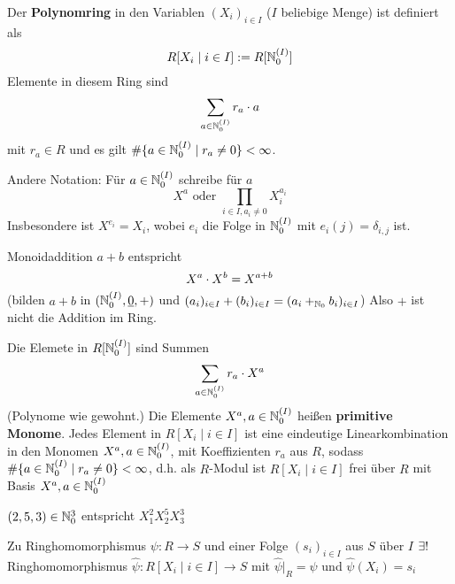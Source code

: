 \documentclass[a4paper]{report}
\begin{document}
\begin{defi}
  Der \textbf{Polynomring} in den Variablen $(X_{i})_{i \in I}$ ($I$ beliebige Menge) ist definiert als
  \[R[X_{i} \mid i \in I] := R[\mathbb{N}_0^{(I)}]\]
  Elemente in diesem Ring sind
  \[\sum_{a \in \mathbb{N}_0^{(I)}}r_{a}\cdot a\]
  mit $r_{a} \in R$ und es gilt $\#\{a \in \mathbb{N}_0^{(I)} \mid r_{a} \ne 0\} < \infty$.
\end{defi}
\begin{nota*}
  Andere Notation: Für $a \in \mathbb{N}_0^{(I)}$ schreibe für $a$ \[X^{a} \text{ oder } \prod_{i \in I, a_{i} \ne 0} X_{i}^{a_{i}}\]
  Insbesondere ist \(X^{e_{i}} = X_{i}\), wobei $e_{i}$ die Folge in $\mathbb{N}_0^{(I)}$ mit $e_{i}(j) = \delta_{i,j}$ ist.
  \item Monoidaddition $a + b$ entspricht \[X^{a} \cdot X^{b} = X^{a + b}\]
  (bilden $a + b$ in $(\mathbb{N}_0^{(I)}, \underline 0, +)$ und $(a_{i})_{i \in I} + (b_{i})_{i \in I} = (a_{i} +_{\mathbb{N}_0} b_{i})_{i \in I}$) Also $+$ ist nicht die Addition im Ring.
\end{nota*}
\begin{defi*}
Die Elemete in $R[\mathbb{N}_0^{(I)}]$ sind Summen \[\sum_{a \in \mathbb{N}_0^{(I)}}r_{a} \cdot X^{a}\] (Polynome wie gewohnt.) Die Elemente $X^{a}, a \in \mathbb{N}_0^{(I)}$ heißen \textbf{primitive Monome}. Jedes Element in $R[X_{i} \mid i \in I]$ ist eine eindeutige Linearkombination in den Monomen $X^{a}, a \in \mathbb{N}_0^{(I)}$, mit Koeffizienten $r_{a}$ aus $R$, sodass $\#\{a \in \mathbb{N}_0^{(I)} \mid r_{a} \ne 0\} < \infty$, d.h. als $R$-Modul ist $R[X_{i} \mid i \in I]$ frei über $R$ mit Basis $X^{a}, a \in \mathbb{N}_0^{(I)}$
\end{defi*}
\begin{bsp*}
$(2, 5, 3) \in \mathbb{N}_0^{3}$ entspricht $X_{1}^{2}X_{2}^{5}X_{3}^{3}$
\end{bsp*}

\begin{satz} Zu Ringhomomorphismus $\psi : R \to S$ und einer Folge $(s_{i})_{i \in I}$ aus $S$ über $I$ $\exists !$ Ringhomomorphismus $\hat \psi : R[X_{i}\mid i \in I] \to S$ mit $\hat \psi|_{R} = \psi$ und $\hat \psi(X_{i}) = s_{i}$
\end{satz}
\end{document}
